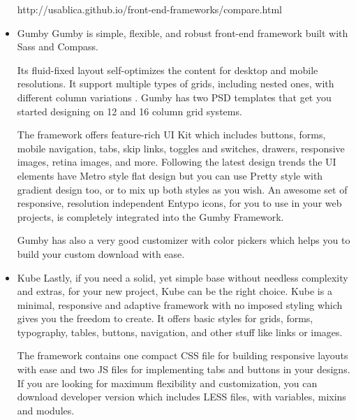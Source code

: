\begin{itemize}
http://usablica.github.io/front-end-frameworks/compare.html

\item Gumby
\newline
Gumby is simple, flexible, and robust front-end framework built with Sass and Compass.

Its fluid-fixed layout self-optimizes the content for desktop and mobile resolutions. It support multiple types of grids, including nested ones, with different column variations . Gumby has two PSD templates that get you started designing on 12 and 16 column grid systems.

The framework offers feature-rich UI Kit which includes buttons, forms, mobile navigation, tabs, skip links, toggles and switches, drawers, responsive images, retina images, and more. Following the latest design trends the UI elements have Metro style flat design but you can use Pretty style with gradient design too, or to mix up both styles as you wish. An awesome set of responsive, resolution independent Entypo icons, for you to use in your web projects, is completely integrated into the Gumby Framework.

Gumby has also a very good customizer with color pickers which helps you to build your custom download with ease.
\item Kube
\newline
Lastly, if you need a solid, yet simple base without needless complexity and extras, for your new project, Kube can be the right choice. Kube is a minimal, responsive and adaptive framework with no imposed styling which gives you the freedom to create. It offers basic styles for grids, forms, typography, tables, buttons, navigation, and other stuff like links or images.

The framework contains one compact CSS file for building responsive layouts with ease and two JS files for implementing tabs and buttons in your designs. If you are looking for maximum flexibility and customization, you can download developer version which includes LESS files, with variables, mixins and modules.
\end{itemize}

